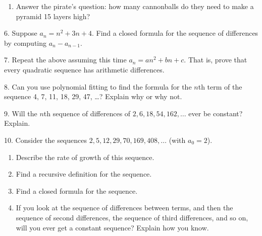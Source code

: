 \documentclass[10pt,]{book}
\theoremstyle{plain}
\theoremstyle{definition}
\numberwithin{equation}{chapter}
\begin{document}
\begin{exerciselist}
\begin{enumerate}[label=(\alph*)]
\item\hypertarget{li-571}{}
              Answer the pirate's question: how many cannonballs do they need to make a pyramid 15 layers high?



\end{enumerate}
\par\smallskip
\item[6.]\hypertarget{exercise-167}{}
          Suppose \(a_n = n^2 + 3n + 4\). Find a closed formula for the sequence of differences by computing \(a_n - a_{n-1}\).
\par\smallskip
\item[7.]\hypertarget{exercise-168}{}
          Repeat the above assuming this time \(a_n = an^2 + bn + c\). That is, prove that every quadratic sequence has arithmetic differences.
\par\smallskip
\item[8.]\hypertarget{exercise-169}{}
          Can you use polynomial fitting to find the formula for the \(n\)th term of the sequence 4, 7, 11, 18, 29, 47,
          \dots{}? Explain why or why not.
\par\smallskip
\item[9.]\hypertarget{exercise-170}{}
          Will the \(n\)th sequence of differences of \(2, 6, 18, 54, 162, \ldots\) ever be constant? Explain.
\par\smallskip
\item[10.]\hypertarget{exercise-171}{}
          Consider the sequences \(2, 5, 12, 29, 70, 169, 408,\ldots\) (with \(a_0 = 2\)).
\leavevmode%
\begin{enumerate}[label=(\alph*)]
\item\hypertarget{li-572}{}
              Describe the rate of growth of this sequence.


\item\hypertarget{li-573}{}
              Find a recursive definition for the sequence.


\item\hypertarget{li-574}{}
              Find a closed formula for the sequence.



\item\hypertarget{li-575}{}
              If you look at the sequence of differences between terms, and then the sequence of second differences, the sequence of third differences, and so on, will you ever get a constant sequence? Explain how you know.


\end{enumerate}
\par\smallskip
\end{exerciselist}
\typeout{************************************************}
\typeout{************************************************}
\end{document}
